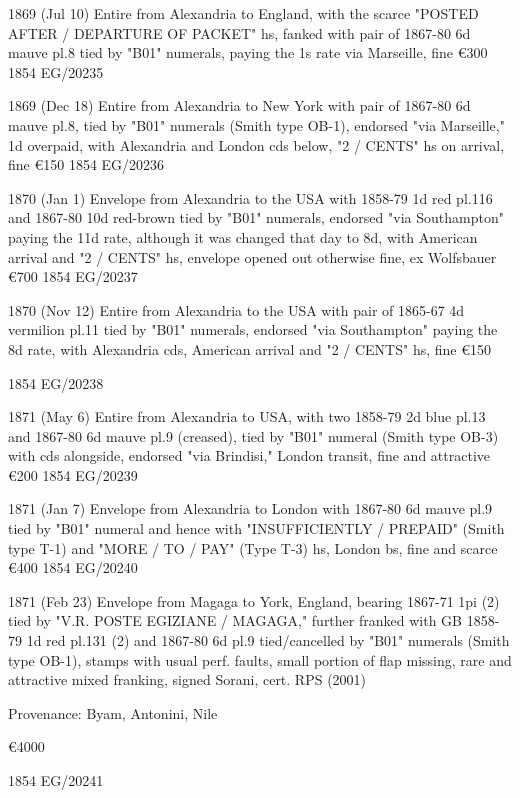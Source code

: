 \documentclass[justified]{tufte-book}
\begin{document}
%
{1869 (Jul 10) Entire from Alexandria to England, with the scarce "POSTED AFTER / DEPARTURE OF PACKET" hs, fanked with pair of 1867-80 6d mauve pl.8 tied by "B01" numerals, paying the 1s rate via Marseille, fine \euro300
}
{1854}%
{EG/20235}%
{}%
{}
{}%
{}

%
{1869 (Dec 18) Entire from Alexandria to New York with pair of 1867-80 6d mauve pl.8, tied by "B01" numerals (Smith type OB-1), endorsed "via Marseille," 1d overpaid, with Alexandria and London cds below, "2 / CENTS" hs on arrival, fine \euro150
}
{1854}%
{EG/20236}%
{}%
{}
{}%
{}

%
{1870 (Jan 1) Envelope from Alexandria to the USA with 1858-79 1d red pl.116 and 1867-80 10d red-brown tied by "B01" numerals, endorsed "via Southampton" paying the 11d rate, although it was changed that day to 8d, with American arrival and "2 / CENTS" hs, envelope opened out otherwise fine, ex Wolfsbauer \euro700
}
{1854}%
{EG/20237}%
{}%
{}
{}%
{}

%
{1870 (Nov 12) Entire from Alexandria to the USA with pair of 1865-67 4d vermilion pl.11 tied by "B01" numerals, endorsed "via Southampton" paying the 8d rate, with Alexandria cds, American arrival and "2 / CENTS" hs, fine \euro150

}
{1854}%
{EG/20238}%
{}%
{}
{}%
{}

%
{1871 (May 6) Entire from Alexandria to USA, with two 1858-79 2d blue pl.13 and 1867-80 6d mauve pl.9 (creased), tied by "B01" numeral (Smith type OB-3) with cds alongside, endorsed "via Brindisi," London transit, fine and attractive \euro200
}
{1854}%
{EG/20239}%
{}%
{}
{}%
{}

%
{1871 (Jan 7) Envelope from Alexandria to London with 1867-80 6d mauve pl.9 tied by "B01" numeral and hence with "INSUFFICIENTLY / PREPAID" (Smith type T-1) and "MORE / TO / PAY" (Type T-3) hs, London bs, fine and scarce \euro400
}
{1854}%
{EG/20240}%
{}%
{}
{}%
{}

%
{1871 (Feb 23) Envelope from Magaga to York, England, bearing 1867-71 1pi (2) tied by "V.R. POSTE EGIZIANE / MAGAGA," further franked with GB 1858-79 1d red pl.131 (2) and 1867-80 6d pl.9 tied/cancelled by "B01" numerals (Smith type OB-1), stamps with usual perf. faults, small portion of flap missing, rare and attractive mixed franking, signed Sorani, cert. RPS (2001)

Provenance: Byam, Antonini, Nile

\euro4000
}
{1854}%
{EG/20241}%
{}%
{}
{}%
{}
\end{document}
